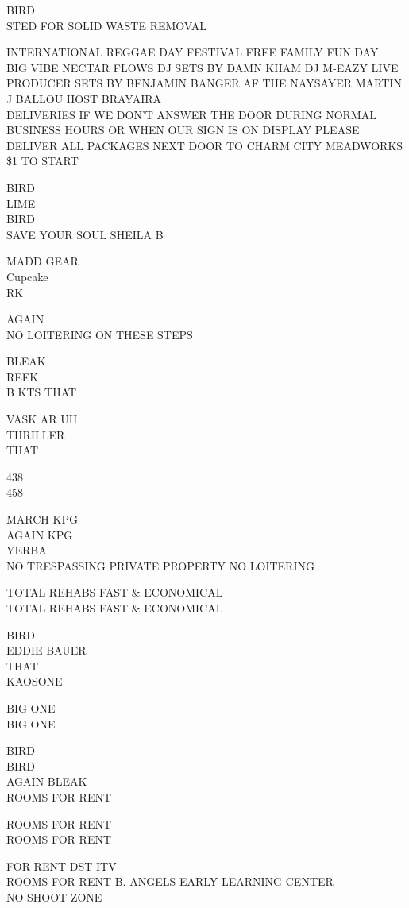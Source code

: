\documentclass[10pt,letterpaper]{article}
\begin{document}
BIRD\\
STED FOR SOLID WASTE REMOVAL

INTERNATIONAL REGGAE DAY FESTIVAL FREE FAMILY FUN DAY\\
BIG VIBE NECTAR FLOWS DJ SETS BY DAMN KHAM DJ M{-}EAZY LIVE PRODUCER SETS BY BENJAMIN BANGER AF THE NAYSAYER MARTIN J BALLOU HOST BRAYAIRA\\
DELIVERIES IF WE DON'T ANSWER THE DOOR DURING NORMAL BUSINESS HOURS OR WHEN OUR SIGN IS ON DISPLAY PLEASE DELIVER ALL PACKAGES NEXT DOOR TO CHARM CITY MEADWORKS\\
\$1 TO START

BIRD\\
LIME\\
BIRD\\
SAVE YOUR SOUL SHEILA B

MADD GEAR\\
Cupcake\\
RK

AGAIN\\
NO LOITERING ON THESE STEPS

BLEAK\\
REEK\\
B KTS THAT

VASK AR UH\\
THRILLER\\
THAT

438\\
458

MARCH KPG\\
AGAIN KPG\\
YERBA\\
NO TRESPASSING PRIVATE PROPERTY NO LOITERING

TOTAL REHABS FAST \& ECONOMICAL\\
TOTAL REHABS FAST \& ECONOMICAL

BIRD\\
EDDIE BAUER\\
THAT\\
KAOSONE

BIG ONE\\
BIG ONE

BIRD\\
BIRD\\
AGAIN BLEAK\\
ROOMS FOR RENT

ROOMS FOR RENT\\
ROOMS FOR RENT

FOR RENT DST ITV\\
ROOMS FOR RENT B. ANGELS EARLY LEARNING CENTER\\
NO SHOOT ZONE
\end{document}
